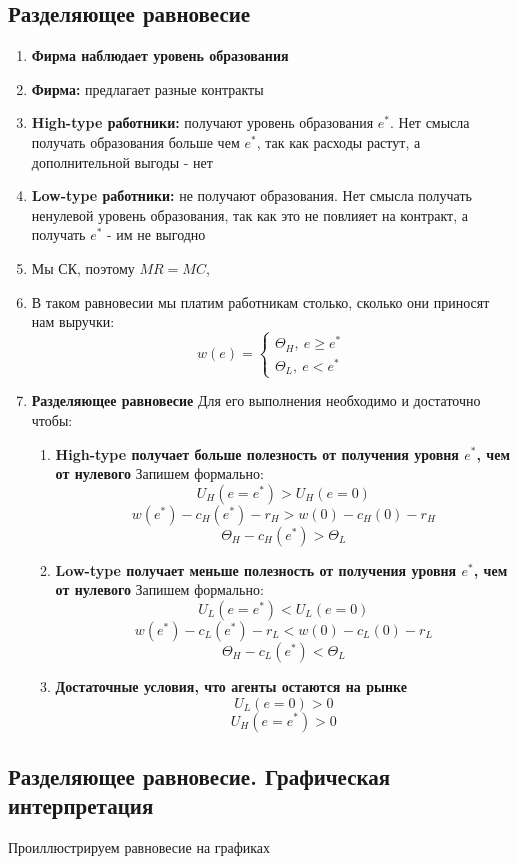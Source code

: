\subsection{Разделяющее равновесие}
\begin{enumerate}
    \item \textbf{Фирма наблюдает уровень образования}
    \item \textbf{Фирма:} предлагает разные контракты
    \item \textbf{High-type работники:} получают уровень образования $e^*$. Нет смысла получать образования больше чем $e^*$, так как расходы растут, а дополнительной выгоды - нет
    \item \textbf{Low-type работники:} не получают образования. Нет смысла получать ненулевой уровень образования, так как это не повлияет на контракт, а получать $e^*$ - им не выгодно
    \item Мы СК, поэтому $MR=MC$,
    \item В таком равновесии мы платим работникам столько, сколько они приносят нам выручки: $$w(e)=\begin{cases}
        \Theta_H, \ e \geq e^* \\
        \Theta_L, \ e < e^*
    \end{cases}$$
    \item \textbf{Разделяющее равновесие} Для его выполнения необходимо и достаточно чтобы:\begin{enumerate}
        \item \textbf{High-type получает больше полезность от получения уровня $e^*$, чем от нулевого} Запишем формально:$$U_H(e=e^*)>U_H(e=0)$$
        $$w(e^*)-c_H(e^*)-r_H>w(0)-c_H(0)-r_H$$
        $$\Theta_H-c_H(e^*)>\Theta_L$$
        \item \textbf{Low-type получает меньше полезность от получения уровня $e^*$, чем от нулевого} Запишем формально:$$U_L(e=e^*)<U_L(e=0)$$
        $$w(e^*)-c_L(e^*)-r_L<w(0)-c_L(0)-r_L$$
        $$\Theta_H-c_L(e^*)<\Theta_L$$
        \item \textbf{Достаточные условия, что агенты остаются на рынке} $$U_L(e=0)>0$$
        $$U_H(e=e^*)>0$$
    \end{enumerate}
\end{enumerate}
\subsection{Разделяющее равновесие. Графическая интерпретация}
\indent\setlength{\parindent}{1em}Проиллюстрируем равновесие на графиках
